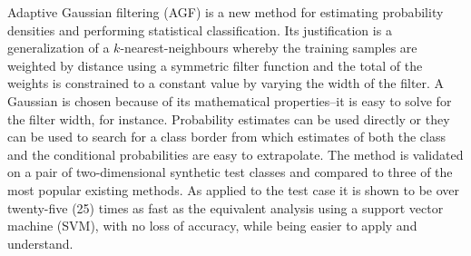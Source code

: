 Adaptive Gaussian filtering (AGF) is a new method for estimating
probability densities and performing statistical classification.
Its justification is a generalization of a $k$-nearest-neighbours
whereby the training samples are weighted by distance
using a symmetric filter function and the total of the weights 
is constrained to a constant value by varying the width of the
filter.  A Gaussian is chosen 
because of its mathematical properties--it is easy to solve
for the filter width, for instance.  
Probability estimates 
can be used directly or they can be used to search for a 
class border from which estimates of both the
class and the conditional probabilities are easy to extrapolate.
The method is validated on a pair of two-dimensional synthetic
test classes and compared
to three of the most popular existing methods.  
As applied to the test case it is shown
to be over twenty-five (25) times as fast as the equivalent
analysis using a support vector machine (SVM), with no loss of
accuracy, while being easier to apply and understand.
